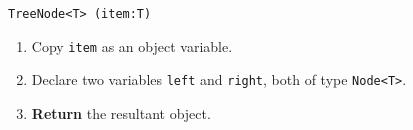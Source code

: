 

\problem

\solution

\algorithm
\texttt{TreeNode<T> (item:T)}
\begin{enumerate}
	\item Copy \texttt{item} as an object variable.
	\item Declare two variables \texttt{left} and \texttt{right}, both of type \texttt{Node<T>}.
	\item \textbf{Return} the resultant object.
\end{enumerate}
\vspace{5mm}

\sourcecode




\varDescription
